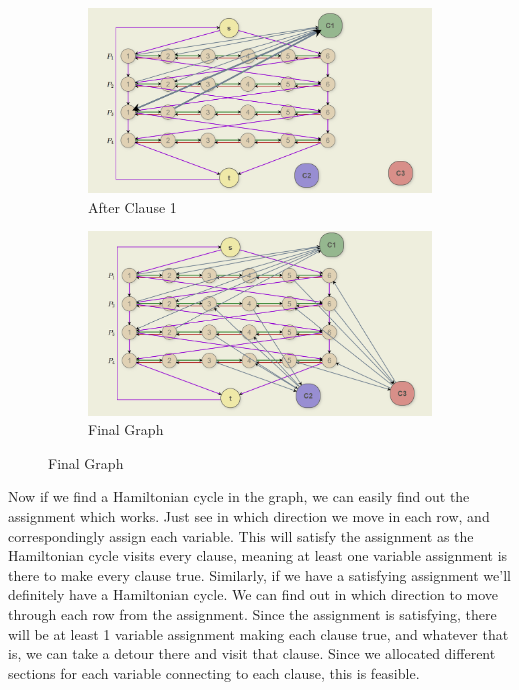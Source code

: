 \documentclass[12pt]{report}
\begin{document}
\begin{enumerate}[label=\textbf{\arabic*.}]
    \begin{figure}[H]
        \centering
        \begin{subfigure}[b]{0.45\textwidth}
            \centering
            \includegraphics[width=\textwidth]{C1Hamiltonian.png}
            \caption*{After Clause 1}
        \end{subfigure}
        \hfill
        \begin{subfigure}[b]{0.45\textwidth}
            \centering
            \includegraphics[width=\textwidth]{FinalHamiltonian.png}
            \caption*{Final Graph}
        \end{subfigure}
    \end{figure}

    Now if we find a Hamiltonian cycle in the graph, we can easily find out the assignment which works. Just see in which direction we move in 
    each row, and correspondingly assign each variable. This will satisfy the assignment as the Hamiltonian cycle visits every clause, meaning 
    at least one variable assignment is there to make every clause true. Similarly, if we have a satisfying assignment we'll definitely have a
    Hamiltonian cycle. We can find out in which direction to move through each row from the assignment. Since the assignment is satisfying, there 
    will be at least 1 variable assignment making each clause true, and whatever that is, we can take a detour there and visit that clause. Since
    we allocated different sections for each variable connecting to each clause, this is feasible.


\end{enumerate}
\end{document}
